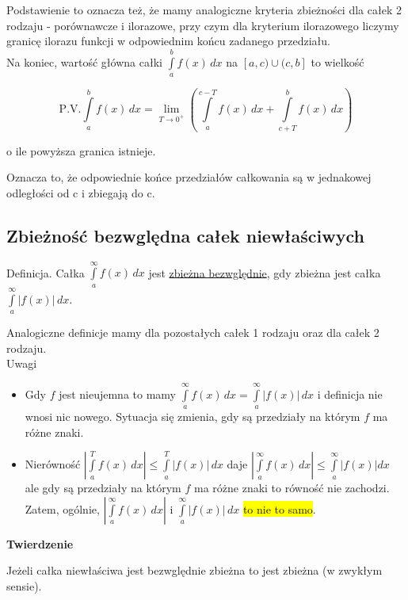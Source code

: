 \documentclass[12pt]{article}
\begin{document}
Podstawienie to oznacza też, że mamy analogiczne kryteria zbieżności dla całek 2 rodzaju - porównawcze i ilorazowe, przy
czym dla kryterium ilorazowego liczymy granicę ilorazu funkcji w odpowiednim końcu zadanego przedziału. \\

Na koniec, wartość główna całki $ \int\limits_{a}^{b} f(x) \,dx $ na $[a,c)\cup(c,b]$ to wielkość

$$ \textrm{P.V.} \int\limits_{a}^{b} f(x) \,dx = \lim_{T \to 0^+} 
\left( \int\limits_{a}^{c - T} f(x) \,dx + \int\limits_{c + T}^{b} f(x) \,dx \right) $$

o ile powyższa granica istnieje.

Oznacza to, że odpowiednie końce przedziałów całkowania są w jednakowej odległości od c i zbiegają do c.

\subsection*{Zbieżność bezwględna całek niewłaściwych}

Definicja. Całka $ \int\limits_{a}^{\infty} f(x) \,dx $ jest \underline{zbieżna bezwględnie}, gdy zbieżna jest całka
$ \int\limits_{a}^{\infty} |f(x)| \,dx $.

Analogiczne definicje mamy dla pozostałych całek 1 rodzaju oraz dla całek 2 rodzaju. \\

Uwagi

\begin{itemize}
    \item Gdy $f$ jest nieujemna to mamy $ \int\limits_{a}^{\infty} f(x) \,dx = \int\limits_{a}^{\infty} |f(x)| \,dx $
    i definicja nie wnosi nic nowego. Sytuacja się zmienia, gdy są przedziały na którym $f$ ma różne znaki.
    
    \item Nierówność $ \left| \int\limits_{a}^{T} f(x) \,dx \right| \leq \int\limits_{a}^{T} |f(x)| \,dx $ daje
    $ \left| \int\limits_{a}^{\infty} f(x) \,dx \right| \leq \int\limits_{a}^{\infty} |f(x)| dx $ ale gdy są przedziały
    na którym $f$ ma różne znaki to równość nie zachodzi.
    Zatem, ogólnie, $ \left| \int\limits_{a}^{\infty} f(x) \,dx \right| $ i $ \int\limits_{a}^{\infty} |f(x)| \,dx $
    \colorbox{yellow}{to nie to samo}. \\
\end{itemize}

\textbf{Twierdzenie}

Jeżeli całka niewłaściwa jest bezwględnie zbieżna to jest zbieżna (w zwykłym sensie).
\end{document}
